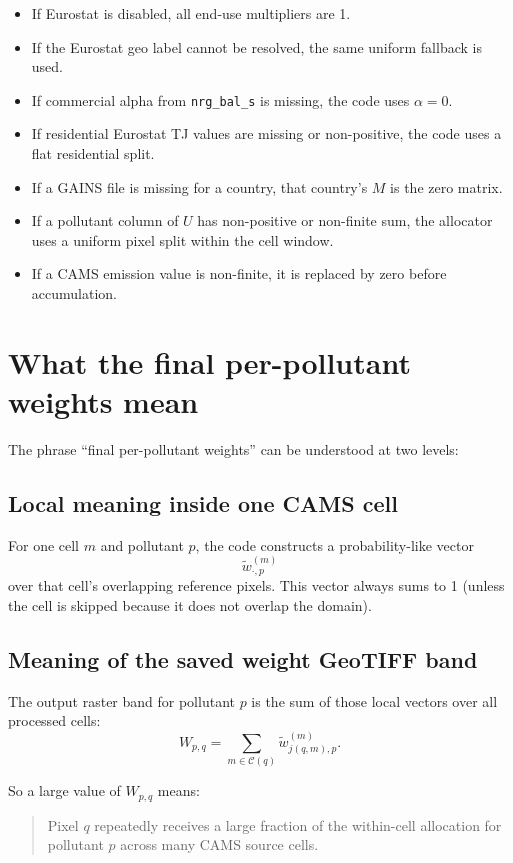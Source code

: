 \documentclass[11pt,a4paper]{article}
\begin{document}
\begin{itemize}[leftmargin=1.4em]
  \item If Eurostat is disabled, all end-use multipliers are 1.
  \item If the Eurostat geo label cannot be resolved, the same uniform fallback is used.
  \item If commercial alpha from \texttt{nrg\_bal\_s} is missing, the code uses $\alpha=0$.
  \item If residential Eurostat TJ values are missing or non-positive, the code uses a flat residential split.
  \item If a GAINS file is missing for a country, that country's $M$ is the zero matrix.
  \item If a pollutant column of $U$ has non-positive or non-finite sum, the allocator uses a uniform pixel split within the cell window.
  \item If a CAMS emission value is non-finite, it is replaced by zero before accumulation.
\end{itemize}

\section{What the final per-pollutant weights mean}

The phrase ``final per-pollutant weights'' can be understood at two levels:

\subsection{Local meaning inside one CAMS cell}

For one cell $m$ and pollutant $p$, the code constructs a probability-like vector
\[
\widetilde{w}^{(m)}_{\cdot,p}
\]
over that cell's overlapping reference pixels. This vector always sums to 1
(unless the cell is skipped because it does not overlap the domain).

\subsection{Meaning of the saved weight GeoTIFF band}

The output raster band for pollutant $p$ is the sum of those local vectors over all
processed cells:
\[
W_{p,q} = \sum_{m \in \mathcal{C}(q)} \widetilde{w}^{(m)}_{j(q,m),p}.
\]

So a large value of $W_{p,q}$ means:

\begin{quote}
Pixel $q$ repeatedly receives a large fraction of the within-cell allocation for pollutant $p$
across many CAMS source cells.
\end{quote}
\end{document}
